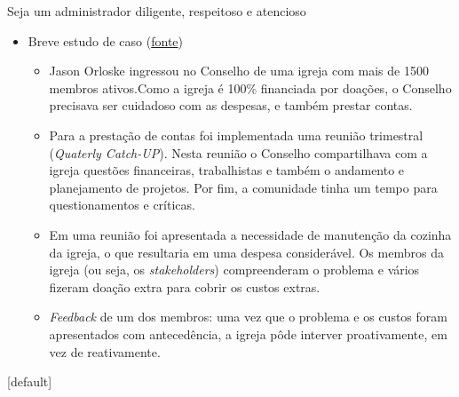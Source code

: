 \documentclass{beamer}
\begin{document}
\begin{frame}{Seja um administrador diligente, respeitoso e atencioso}
	\begin{itemize}
		\justifying
		\item Breve estudo de caso (\href{https://www.thepmoleader.com/blog/the-principles-of-being-a-good-steward-pmbok-3-1}{fonte})
			\begin{itemize}
				\justifying
				\item<1-> Jason Orloske ingressou no Conselho de uma igreja com mais de 1500 membros ativos.Como a igreja é 100\% financiada por doações, o Conselho precisava ser cuidadoso com as despesas, e também prestar contas.
				\item<2-> Para a prestação de contas foi implementada uma reunião trimestral (\textit{Quaterly Catch-UP}). Nesta reunião o Conselho compartilhava com a igreja questões financeiras, trabalhistas e também o andamento e planejamento de projetos. Por fim, a comunidade tinha um tempo para questionamentos e críticas.
				\item<3-> Em uma reunião foi apresentada a necessidade de manutenção da cozinha da igreja, o que resultaria em uma despesa considerável. Os membros da igreja (ou seja, os \textit{stakeholders}) compreenderam o problema e vários fizeram doação extra para cobrir os custos extras.
				\item<4> \textit{Feedback} de um dos membros: uma vez que o problema e os custos foram apresentados com antecedência, a igreja pôde interver proativamente, em vez de reativamente.
			\end{itemize}
	\end{itemize}
\end{frame}

[default]
\end{document}
